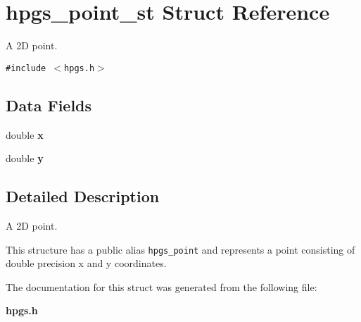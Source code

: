 \section{hpgs\_\-point\_\-st Struct Reference}
\label{structhpgs__point__st}
A 2D point.  


{\tt \#include $<$hpgs.h$>$}

\subsection*{Data Fields}
\begin{CompactItemize}
\item 
double \textbf{x}\label{structhpgs__point__st_511eb8c19d4db5d0de9056d168cda20f}

\item 
double \textbf{y}\label{structhpgs__point__st_635076d8d6573e32f3ae6d2222807ed0}

\end{CompactItemize}


\subsection{Detailed Description}
A 2D point. 

This structure has a public alias {\tt hpgs\_\-point} and represents a point consisting of double precision x and y coordinates. 

The documentation for this struct was generated from the following file:\begin{CompactItemize}
\item 
{\bf hpgs.h}\end{CompactItemize}
